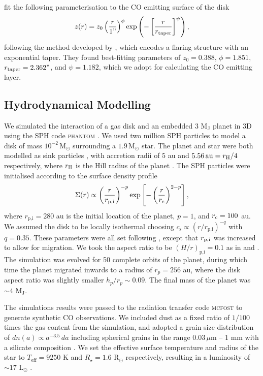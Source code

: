 \citet{law2021a} fit the following parameterisation to the CO emitting surface of the disk
\begin{align}
    z(r) = z_0 \left( \frac{r}{1"} \right)^\phi \exp \left( -\left[ \frac{r}{r_\mathrm{taper}} \right]^{\psi} \right), \label{eq:height}
\end{align}
following the method developed by \citet{pinte2018}, which encodes a flaring structure with an exponential taper.
They found best-fitting parameters of $z_0 = 0.388$, $\phi = 1.851$, $r_\textrm{taper} = 2.362"$, and $\psi = 1.182$, which we adopt for calculating the CO emitting layer.

\subsection{Hydrodynamical Modelling} \label{sec:calcino_hydro}

We simulated the interaction of a gas disk and an embedded 3 M$_\textrm{J}$ planet in 3D using the SPH code \textsc{phantom} \citep{price2018}.
We used two million SPH particles to model a disk of mass $10^{-2} \, \mathrm{M_\odot}$ surrounding a $1.9 \, \mathrm{M_\odot}$ star.
The planet and star were both modelled as sink particles \citep{bate1995}, with accretion radii of $5$ au and $5.56 \, \mathrm{au} = r_{\rm H}/4$ respectively, where $r_{\rm H}$ is the Hill radius of the planet \citep{hill1878}.
The SPH particles were initialised according to the surface density profile
\begin{align}
    \Sigma (r) \propto \left(\frac{r}{r_\mathrm{p,i}}\right)^{-p} \exp \left[-\left(\frac{r}{r_{\rm c}}\right)^{2-p}\right], \label{eq:sigma_phantom}
\end{align}
where $r_\textrm{p,i} = 280$ au is the initial location of the planet, $p = 1$, and  $r_{\rm c} = 100 $ au.
We assumed the disk to be locally isothermal choosing $c_\textrm{s} \propto (r/r_\textrm{p,i})^{-q}$ with $q = 0.35$.
These parameters were all set following \citet{pinte2018a}, except that $r_{\rm p,i}$ was increased to allow for migration.
We took the aspect ratio to be $(H/r)_{\textrm{p,i}} = 0.1$ as in \citet{degregorio-monsalvo2013} and \citet{pinte2018a}.
The simulation was evolved for 50 complete orbits of the planet, during which time the planet migrated inwards to a radius of $r_p = 256$ au, where the disk aspect ratio was slightly smaller $h_p/r_p \sim 0.09$.
The final mass of the planet was $\sim 4$ $\mathrm{M_J}$.

The simulations results were passed to the radiation transfer code \textsc{mcfost} \citep{pinte2006,pinte2009} to generate synthetic CO observations.
We included dust as a fixed ratio of $1/100$ times the gas content from the simulation, and adopted a grain size distribution of $dn(a) \propto a^{-3.5} \, da$ including spherical grains in the range  $0.03 \, \mu$m -- $1$ mm with a silicate composition \citep{weingartner2001}.
We set the effective surface temperature and radius of the star to $T_\textrm{eff} = 9250$ K and $R_\star = 1.6 $ $\mathrm{R_\odot}$ respectively, resulting in a luminosity of $\sim 17$ L$_\odot$ \citep{setterholm2018}.

